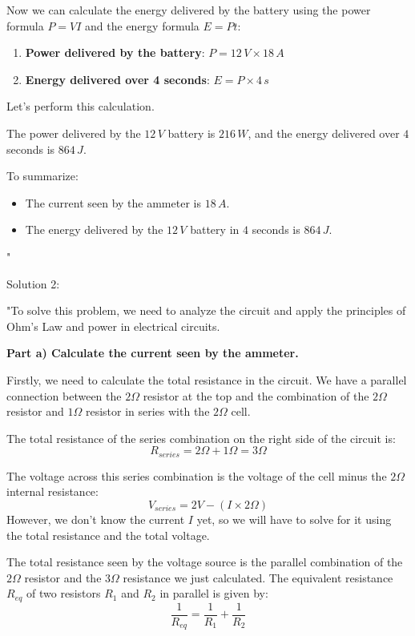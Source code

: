 Now we can calculate the energy delivered by the battery using the power formula \(P = VI\) and the energy formula \(E = Pt\):

\begin{enumerate}
  \item \textbf{Power delivered by the battery}: \(P = 12\,V \times 18\,A\)
  \item \textbf{Energy delivered over 4 seconds}: \(E = P \times 4\,s\)
\end{enumerate}

Let's perform this calculation.

The power delivered by the \(12\,V\) battery is \(216\,W\), and the energy delivered over \(4\) seconds is \(864\,J\).

To summarize:
\begin{itemize}
    \item[a)] The current seen by the ammeter is \(18\,A\).
    \item[b)] The energy delivered by the \(12\,V\) battery in \(4\) seconds is \(864\,J\).
\end{itemize} "

Solution 2:

"To solve this problem, we need to analyze the circuit and apply the principles of Ohm's Law and power in electrical circuits.

\textbf{Part a) Calculate the current seen by the ammeter.}

Firstly, we need to calculate the total resistance in the circuit. We have a parallel connection between the \(2\Omega\) resistor at the top and the combination of the \(2\Omega\) resistor and \(1\Omega\) resistor in series with the \(2\Omega\) cell.

The total resistance of the series combination on the right side of the circuit is:
\[ R_{series} = 2\Omega + 1\Omega = 3\Omega \]

The voltage across this series combination is the voltage of the cell minus the \(2\Omega\) internal resistance:
\[ V_{series} = 2V - (I \times 2\Omega) \]
However, we don't know the current \(I\) yet, so we will have to solve for it using the total resistance and the total voltage.

The total resistance seen by the voltage source is the parallel combination of the \(2\Omega\) resistor and the \(3\Omega\) resistance we just calculated. The equivalent resistance \( R_{eq} \) of two resistors \( R_1 \) and \( R_2 \) in parallel is given by:
\[ \frac{1}{R_{eq}} = \frac{1}{R_1} + \frac{1}{R_2} \]

